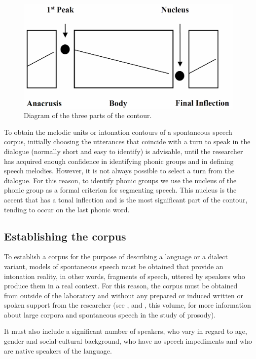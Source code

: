 \documentclass[output=paper]{langscibook}
\begin{document}
\begin{figure}
\includegraphics[width=.7\textwidth]{figures/FON-img2.PNG}
\caption{Diagram of the three parts of the contour.}
\label{fig:font:2}
\end{figure}

To obtain the melodic units or intonation contours of a spontaneous speech corpus, initially choosing the utterances that coincide with a turn to speak in the dialogue (normally short and easy to identify) is advisable, until the researcher has acquired enough confidence in identifying phonic groups and in defining speech melodies. However, it is not always possible to select a turn from the dialogue. For this reason, to identify phonic groups we use the nucleus of the phonic group as a formal criterion for segmenting speech. This nucleus is the accent that has a tonal inflection and is the most significant part of the contour, tending to occur on the last phonic word. 

\subsection{Establishing the corpus}
\label{sec:font:2.3}
To establish a corpus for the purpose of describing a language or a dialect variant, models of spontaneous speech must be obtained that provide an intonation reality, in other words, fragments of speech, uttered by speakers who produce them in a real context. For this reason, the corpus must be obtained from outside of the laboratory and without any prepared or induced written or spoken support from the researcher (see \citeauthor{GarridoAlminana.2018}, \citeauthor{TeixeiraKalkhoff.2018} and \citeauthor{Peskova.2018}, this volume, for more information about large corpora and spontaneous speech in the study of prosody). 

It must also include a significant number of speakers, who vary in regard to age, gender and social-cultural background, who have no speech impediments and who are native speakers of the language. 
\end{document}

